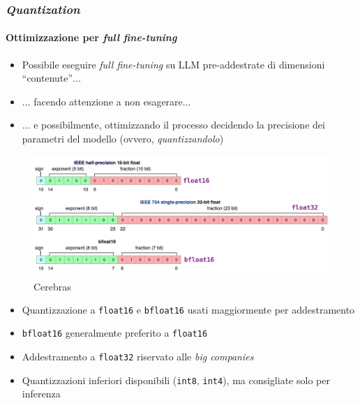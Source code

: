 \begin{frame}[t] \frametitle{\emph{Quantization}}
\framesubtitle{Ottimizzazione per \emph{full fine-tuning}}
{\scriptsize
{}
    \begin{minipage}[t]{\textwidth}
        \vspace*{-.5cm}
        \begin{itemize}[leftmargin=10pt,align=right]
            \item[\alert{\faArrowCircleRight}] Possibile eseguire \emph{full fine-tuning} su LLM pre-addestrate di dimensioni ``contenute''$\ldots$
            \item[\alert{\faArrowCircleRight}] $\ldots$ facendo attenzione a non esagerare$\ldots$
            \item[\alert{\faArrowCircleRight}] $\ldots$ e possibilmente, \alert{ottimizzando il processo} decidendo la precisione dei parametri del modello (ovvero, \emph{quantizzandolo})
        \end{itemize}
    \end{minipage}
    \begin{minipage}[t]{\textwidth}
        \vspace*{.2cm}
            \begin{figure}
                \centering
                \includegraphics[width=.7\textwidth]{img/quantization-no-bg.png}\\\textsuperscript{\textcopyright}Cerebras
            \end{figure}
    \end{minipage}
    \begin{minipage}[t]{\textwidth}
        \vspace*{.2cm}
        \begin{itemize}[leftmargin=10pt,align=right]
            \item[\alert{\faArrowCircleRight}] Quantizzazione a \texttt{float16} e \texttt{bfloat16} usati maggiormente per addestramento
            \item[\alert{\faArrowCircleRight}] \texttt{bfloat16} generalmente preferito a \texttt{float16}
            \item[\alert{\faArrowCircleRight}] Addestramento a \texttt{float32} riservato alle \emph{big companies}
            \item[\alert{\faArrowCircleRight}] Quantizzazioni inferiori disponibili (\texttt{int8}, \texttt{int4}), ma consigliate solo per inferenza
        \end{itemize}
    \end{minipage}
}
\end{frame}
